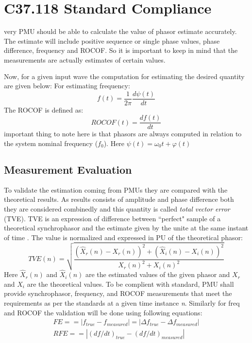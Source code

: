 \section{C37.118 Standard Compliance}
very PMU should be able to calculate the value of phasor estimate accurately. The estimate will include positive sequence or single phase values, phase difference, frequency and ROCOF. So it is important to keep in mind that the measurements are actually estimates of certain values.

Now, for a given input wave the computation for estimating the desired quantity are given below:
For estimating frequency:
\begin{equation}
f(t) = \frac{1}{2\pi} \dfrac{d\psi(t)}{dt}
\end{equation}
The ROCOF is defined as:
\begin{equation}
ROCOF(t) = \dfrac{df(t)}{dt}
\end{equation}
important thing to note here is that phasors are always computed in relation to the system nominal frequency ($f_0$). Here $\psi(t) = \omega_0 t + \varphi(t)$

\subsection{Measurement Evaluation}
To validate the estimation coming from PMUs they are compared with the theoretical results. As results consists of amplitude and phase difference both they are considered combinedly and this quantity is called \textit{total vector error} (TVE). TVE is an expression of difference between ``perfect" sample of a theoretical synchrophasor and the estimate given by the unite at the same instant of time \cite{std:c37}. The value is normalized and expressed in PU of the theoretical phasor:
\begin{equation}
TVE(n) = \sqrt{\frac{ (\hat{X}_r(n) - X_r(n))^2 + (\hat{X}_i(n)-X_i(n))^2} {X_r(n)^2 + X_i(n)^2}}
\end{equation}
Here $ \hat{X}_r (n)$ and $\hat{X}_i(n) $ are the estimated values of the given phasor and $X_r$ and $X_i$ are the theoretical values.
To be complient with standard, PMU shall provide synchrophasor, frequency, and ROCOF measurements that meet the requirements as per the standards at a given time instance \textit{n}. Similarly for freq and ROCOF the validation will be done using following equations:
\begin{eqnarray}
FE == |f_{true}-f_{measured}| = |\Delta f_{true}-\Delta f_{measured}| \\
RFE == |(df/dt)_{true}-(df/dt)_{measured} |
\end{eqnarray}


